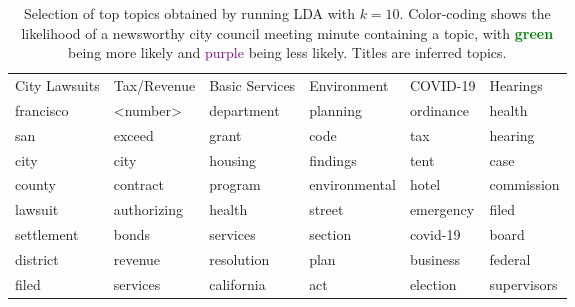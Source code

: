 \documentclass[11pt]{article}
\begin{document}



\appendix

\begin{table}[t]
\centering
\begin{tabular}{llllll}
\toprule
City Lawsuits &                           Tax/Revenue &                          Basic Services &                            Environment &                        COVID-19 &                          Hearings \\
\cmidrule(lr){1-1}\cmidrule(lr){2-2}\cmidrule(lr){3-3}\cmidrule(lr){4-4}\cmidrule(lr){5-5}\cmidrule(lr){6-6}
\cellcolor{purple!44} francisco &         \cellcolor{purple!40} <number> & \cellcolor{purple!30} department &      \cellcolor{green!23} planning & \cellcolor{green!42} ordinance &      \cellcolor{green!49} health \\
       \cellcolor{purple!44} san &      \cellcolor{purple!40} exceed &      \cellcolor{purple!30} grant &          \cellcolor{green!23} code &       \cellcolor{green!42} tax &     \cellcolor{green!49} hearing \\
      \cellcolor{purple!44} city &        \cellcolor{purple!40} city &    \cellcolor{purple!30} housing &      \cellcolor{green!23} findings &      \cellcolor{green!42} tent &        \cellcolor{green!49} case \\
    \cellcolor{purple!44} county &    \cellcolor{purple!40} contract &    \cellcolor{purple!30} program & \cellcolor{green!23} environmental &        \cellcolor{green!42} hotel &  \cellcolor{green!49} commission \\
   \cellcolor{purple!44} lawsuit & \cellcolor{purple!40} authorizing &     \cellcolor{purple!30} health &        \cellcolor{green!23} street & \cellcolor{green!42} emergency &       \cellcolor{green!49} filed \\
\cellcolor{purple!44} settlement &       \cellcolor{purple!40} bonds &   \cellcolor{purple!30} services &       \cellcolor{green!23} section &     \cellcolor{green!42} covid-19 &       \cellcolor{green!49} board \\
  \cellcolor{purple!44} district &     \cellcolor{purple!40} revenue & \cellcolor{purple!30} resolution &          \cellcolor{green!23} plan &  \cellcolor{green!42} business &     \cellcolor{green!49} federal \\
     \cellcolor{purple!44} filed &    \cellcolor{purple!40} services & \cellcolor{purple!30} california &           \cellcolor{green!23} act &  \cellcolor{green!42} election & \cellcolor{green!49} supervisors \\
\bottomrule
\end{tabular}
\caption{Selection of top topics obtained by running LDA with $k=10$. Color-coding shows the likelihood of a newsworthy city council meeting minute containing a topic, with \textcolor{green}{\textbf{green}} being more likely and \textcolor{purple}{purple} being less likely. Titles are inferred topics.}
\label{tbl:top-topics}
\end{table}
\end{document}
